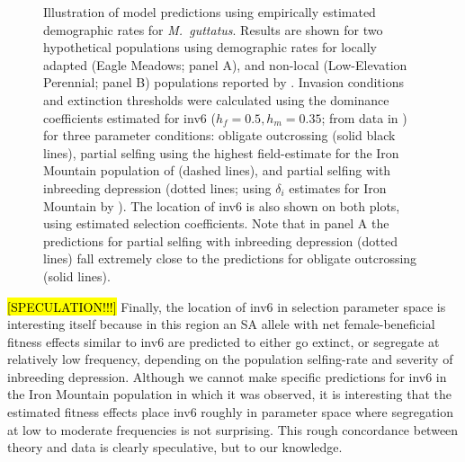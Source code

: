 \documentclass[11pt]{article}
\begin{document}
\begin{figure}[htbp]
 \centering
 \caption{\footnotesize{Illustration of model predictions using empirically estimated demographic rates for {\itshape M.~guttatus}. Results are shown for two hypothetical populations using demographic rates for locally adapted (Eagle Meadows; panel A), and non-local (Low-Elevation Perennial; panel B) populations reported by \citet{PetersonEtAl2016}. Invasion conditions and extinction thresholds were calculated using the dominance coefficients estimated for inv6 ($h_f = 0.5, h_m = 0.35$; from data in \citealt{LeeKelly2015}) for three parameter conditions: obligate outcrossing (solid black lines), partial selfing using the highest field-estimate for the Iron Mountain population of \citet{Willis1993} (dashed lines), and partial selfing with inbreeding depression (dotted lines; using $\delta_i$ estimates for Iron Mountain by \citealt{Willis1993}). The location of inv6 is also shown on both plots, using estimated selection coefficients. Note that in panel A the predictions for partial selfing with inbreeding depression (dotted lines) fall extremely close to the predictions for obligate outcrossing (solid lines).}} 
 \label{fig:mimulusFig}
 \end{figure}


\hl{[SPECULATION!!!]} Finally, the location of inv6 in selection parameter space is interesting itself because in this region an SA allele with net female-beneficial fitness effects similar to inv6 are predicted to either go extinct, or segregate at relatively low frequency, depending on the population selfing-rate and severity of inbreeding depression. Although we cannot make specific predictions for inv6 in the Iron Mountain population in which it was observed, it is interesting that the estimated fitness effects place inv6 roughly in parameter space where segregation at low to moderate frequencies is not surprising. This rough concordance between theory and data is clearly speculative, but to our knowledge. 




\end{document}
